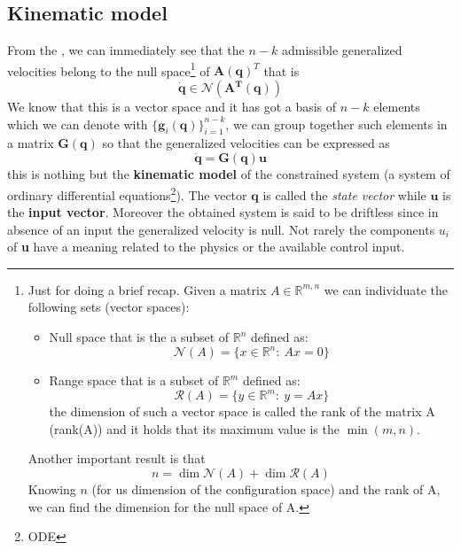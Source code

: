 \subsection{Kinematic model}
From the , we can immediately see that the $n-k$ admissible generalized velocities belong to the null space\footnote{
    Just for doing a brief recap. Given a matrix $A\in\mathbb{R}^{m,n}$ we can individuate the following sets (vector spaces):
    \begin{itemize}
        \itemsep-0.3em
        \item \textsf{Null space} that is the a subset of $\mathbb{R}^n$ defined as: 
        \begin{equation}
            \mathcal{N}(A)=\{x\in\mathbb{R}^n: \ Ax=0\}
        \end{equation}
        \item \textsf{Range space} that is a subset of $\mathbb{R}^m$ defined as: 
        \begin{equation}
            \mathcal{R}(A)=\{y\in\mathbb{R}^m: \ y=Ax\}
        \end{equation}
        the dimension of such a vector space is called the rank of the matrix A (rank(A)) and it holds that its maximum value is the $\min(m,n)$.
    \end{itemize}
    Another important result is that
    \begin{equation*}
        n=\dim{\mathcal{N}(A)}+\dim{\mathcal{R}}(A)
    \end{equation*}
    Knowing $n$ (for us dimension of the configuration space)
 and the rank of A, we can find the dimension for the null space of A.} of $\mathbf{A(q)}^T$ that is 
\begin{equation}
    \dot{\mathbf{q}} \in \mathcal{N}(\mathbf{A^T(q)})
\end{equation}
We know that this is a vector space and it has got a basis of $n-k$ elements which we can denote with $\{\mathbf{g}_i(\mathbf{q})\}_{i=1}^{n-k}$, we can group together such elements in a matrix $\mathbf{G(q)}$ so that the generalized velocities can be expressed as
\begin{equation}
    \mathbf{\dot{q}=G(q)u}
\end{equation}
this is nothing but the \textbf{kinematic model} of the constrained system (a system of ordinary differential equations\footnote{ODE}). The vector $\mathbf{q}$ is called the \emph{state vector} while $\mathbf{u}$ is the \textbf{input vector}. Moreover the obtained system is said to be driftless since in absence of an input the generalized velocity is null. Not rarely the components $u_i$ of \textbf{u} have a meaning related to the physics or the available control input.\\

